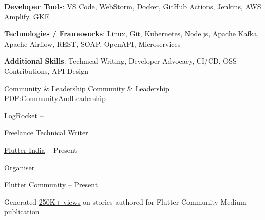 \documentclass[letterpaper,MMMyyyy,nonstopmode]{simpleresumecv}
\newcommand{\CVNote}{Resume compiled on {\today}}
\begin{document}
\begin{Body}
\Gap

\textbf{Developer Tools}: VS Code, WebStorm, Docker, GitHub Actions, Jenkins, AWS Amplify, GKE 

\Gap

\textbf{Technologies / Frameworks}:  Linux, Git, Kubernetes, Node.js, Apache Kafka, Apache Airflow, REST, SOAP, OpenAPI, Microservices 

\Gap

\textbf{Additional Skills}: Technical Writing, Developer Advocacy, CI/CD, OSS Contributions, API Design



\Section
{Community \&\newline
Leadership}
{Community \& Leadership}
{PDF:CommunityAndLeadership}


\Gap
\href{https://blog.logrocket.com/author/himanshusharma/}{LogRocket}
\hfill
{} --
\Gap
\begin{Detail}
Freelance Technical Writer
\end{Detail}

\Gap
\href{https://flutterindia.dev/}{Flutter India}
\hfill
{} -- Present
\Gap
\begin{Detail}
Organiser
\end{Detail}

\Gap
\href{https://medium.com/@himanshusharma89}{Flutter Community}
\hfill
{} -- Present
\Gap
\begin{Detail}
Generated \href{https://medium.com/@himanshusharma89}{\underline{250K+ views}} on stories authored for Flutter Community Medium publication
\end{Detail}

\end{Body}


\end{document}
